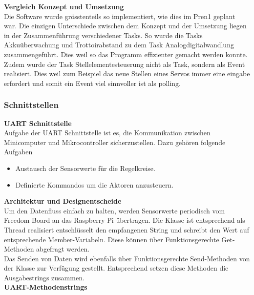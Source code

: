 \textbf{Vergleich Konzept und Umsetzung}\\[0.2cm]
Die Software wurde grösstenteils so implementiert, wie dies im Pren1 geplant war. Die einzigen Unterschiede zwischen dem Konzept und der Umsetzung liegen in der Zusammenführung verschiedener Tasks. So wurde die Tasks Akkuüberwachung und Trottoirabstand zu dem Task Analogdigitalwandlung zusammengeführt. Dies weil so das Programm effizienter gemacht werden konnte. Zudem wurde der Task Stellelementesteuerung nicht als Task, sondern als Event realisiert. Dies weil zum Beispiel das neue Stellen eines Servos immer eine eingabe erfordert und somit ein Event viel sinnvoller ist als polling. 
\subsubsection{Schnittstellen}
\textbf{UART Schnittstelle}\\[0.2cm]
Aufgabe der UART Schnittstelle ist es, die Kommunikation zwischen Minicomputer und Mikrocontroller sicherzustellen. Dazu gehören folgende Aufgaben
\begin{itemize}
\item Austausch der Sensorwerte für die Regelkreise.
\item Definierte Kommandos um die Aktoren anzusteuern.
\end{itemize}
\textbf{Architektur und Designentscheide}\\[0.2cm]
Um den Datenfluss einfach zu halten, werden Sensorwerte periodisch vom Freedom Board an das Raspberry Pi übertragen. Die Klasse  ist entsprechend als Thread realisiert entschlüsselt den empfangenen String und schreibt den Wert auf entsprechende Member-Variabeln. Diese können über Funktionsgerechte Get-Methoden abgefragt werden.\\
Das Senden von Daten wird ebenfalls über Funktionsgerechte Send-Methoden von der Klasse  zur Verfügung gestellt. Entsprechend setzen diese Methoden die Ausgabestrings zusammen.\\[0.2cm]
\textbf{UART-Methodenstrings}
